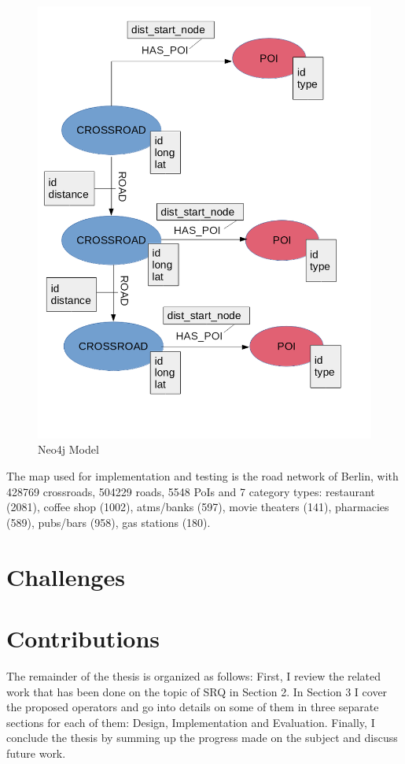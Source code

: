 \begin{figure}[h]
	\includegraphics[scale=0.4]{images/Neo4j-model.png}
	\centering
	\caption{Neo4j Model\cite{evagian}}
	\label{fig:neo4jmodel}
\end{figure}
\fi

 
The map used for implementation and testing is the road network of Berlin, with 428769 crossroads, 504229 roads, 5548 PoIs and 7 category types: restaurant (2081), coffee shop (1002), atms/banks (597), movie theaters (141), pharmacies (589), pubs/bars (958), gas stations (180). 
\newline

\section{Challenges}

\section{Contributions}

The remainder of the thesis is organized as follows: First, I review the related work that has been done on the topic of SRQ in Section 2. In Section 3 I cover the proposed operators and go into details on some of them in three separate sections for each of them: Design, Implementation and Evaluation. Finally, I conclude the thesis by summing up the progress made on the subject and discuss future work.